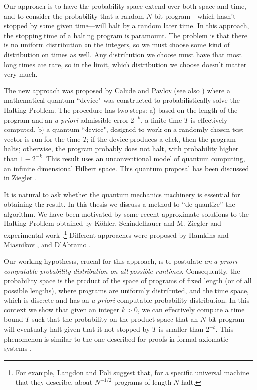 \documentclass[12pt,twoside,openright]{report}
\begin{document}
Our approach is to have the probability space extend over both space and time, and to consider the probability that a random $N$-bit program---which hasn't stopped by some given time---will halt by a random later time.  In this approach, the stopping time of a halting program is paramount. The problem is that there is no uniform distribution on the integers, so we must choose some kind of distribution on times as well.  Any distribution we choose must have that most long times are rare, so in the limit, which distribution we choose doesn't matter very much.

The new approach was proposed by Calude and Pavlov \cite{CP} (see also \cite{ACP}) where a mathematical quantum ``device" was constructed to probabilistically solve the Halting Problem.  The procedure has two steps: a) based on the length of the program and an  {\it a priori} admissible error $2^{-k}$, a finite time $T$ is effectively computed, b) a quantum ``device", designed to work on a randomly chosen test-vector is run for the time $T$; if the device produces a click, then the program halts; otherwise, the program probably does not halt, with probability higher than $1-2^{-k}$. This result uses an unconventional model of quantum computing, an infinite dimensional Hilbert space.  This  quantum proposal has been discussed in  Ziegler \cite{Z}.

 It is natural to ask whether the quantum mechanics machinery is essential for obtaining the result.  In this thesis we discuss a method to ``de-quantize'' the algorithm.  We have been motivated by some recent approximate solutions to the Halting Problem obtained by K\"ohler,  Schindelhauer  and  M. Ziegler \cite{KSZ} and experimental work \cite{CDS,LP}.\footnote{For example, Langdon and Poli \cite{LP} suggest that, for a specific universal machine that they describe, about $N^{-1/2}$ programs of length $N$ halt.}
Different approaches were proposed by Hamkins and Miasnikov 
\cite{HM}, and D'Abramo \cite{D'A}.




Our working hypothesis, crucial for this approach, is to postulate {\it an a priori computable probability distribution on all possible runtimes}. Consequently, the probability space is the product of the space of programs of fixed length (or of all possible lengths), where programs are uniformly distributed, and the time space, which is discrete and has an {\it a priori} computable probability distribution. In this context we show that given an integer $k>0$, we can effectively compute a time bound $T$ such that  the probability on the product space that an $N$-bit program will eventually halt given that it not stopped by $T$ is smaller than
$2^{-k}$. This phenomenon is similar to the one described for proofs in formal axiomatic systems \cite{CJ}.
\end{document}
